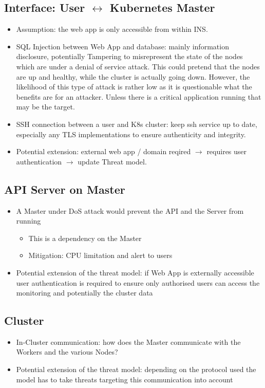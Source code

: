 \subsection{Interface: User \(\leftrightarrow\) Kubernetes Master}
\begin{itemize}
    \item Assumption: the web app is only accessible from within INS.
    \item SQL Injection between Web App and database: mainly information disclosure, potentially Tampering to misrepresent the state of the nodes which are under a denial of service attack. This could pretend that the nodes are up and healthy, while the cluster is actually going down. However, the likelihood of this type of attack is rather low as it is questionable what the benefits are for an attacker. Unless there is a critical application running that may be the target.
    \item SSH connection between a user and K8s cluster: keep ssh service up to date, especially any TLS implementations to ensure authenticity and integrity.
    \item Potential extension: external web app / domain reqired \(\rightarrow\) requires user authentication \(\rightarrow\) update Threat model.
\end{itemize}

\subsection{API Server on Master}
\begin{itemize}
    \item A Master under DoS attack would prevent the API and the Server from running
        \begin{itemize}
            \item This is a dependency on the Master
            \item Mitigation: CPU limitation and alert to users
        \end{itemize}
    \item Potential extension of the threat model: if Web App is externally accessible user authentication is required to ensure only authorised users can access the monitoring and potentially the cluster data
\end{itemize}

\subsection{Cluster}
\begin{itemize}
    \item In-Cluster communication: how does the Master communicate with the Workers and the various Nodes?
    \item Potential extension of the threat model: depending on the protocol used the model has to take threats targeting this communication into account
\end{itemize}

